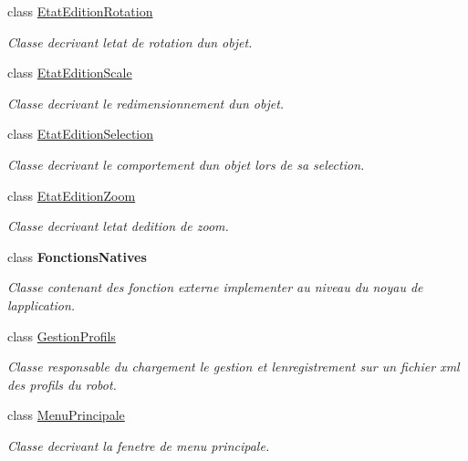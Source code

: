\begin{DoxyCompactItemize}
class \hyperlink{class_interface_graphique_1_1_etat_edition_rotation}{Etat\+Edition\+Rotation}
\begin{DoxyCompactList}\small\item\em Classe decrivant l\textquotesingle{}etat de rotation d\textquotesingle{}un objet. \end{DoxyCompactList}\item 
class \hyperlink{class_interface_graphique_1_1_etat_edition_scale}{Etat\+Edition\+Scale}
\begin{DoxyCompactList}\small\item\em Classe decrivant le redimensionnement d\textquotesingle{}un objet. \end{DoxyCompactList}\item 
class \hyperlink{class_interface_graphique_1_1_etat_edition_selection}{Etat\+Edition\+Selection}
\begin{DoxyCompactList}\small\item\em Classe decrivant le comportement d\textquotesingle{}un objet lors de sa selection. \end{DoxyCompactList}\item 
class \hyperlink{class_interface_graphique_1_1_etat_edition_zoom}{Etat\+Edition\+Zoom}
\begin{DoxyCompactList}\small\item\em Classe decrivant l\textquotesingle{}etat d\textquotesingle{}edition de zoom. \end{DoxyCompactList}\item 
class {\bfseries Fonctions\+Natives}
\begin{DoxyCompactList}\small\item\em Classe contenant des fonction externe implementer au niveau du noyau de l\textquotesingle{}application. \end{DoxyCompactList}\item 
class \hyperlink{class_interface_graphique_1_1_gestion_profils}{Gestion\+Profils}
\begin{DoxyCompactList}\small\item\em Classe responsable du chargement le gestion et l\textquotesingle{}enregistrement sur un fichier xml des profils du robot. \end{DoxyCompactList}\item 
class \hyperlink{class_interface_graphique_1_1_menu_principale}{Menu\+Principale}
\begin{DoxyCompactList}\small\item\em Classe decrivant la fenetre de menu principale. \end{DoxyCompactList}\item 

\end{DoxyCompactItemize}

